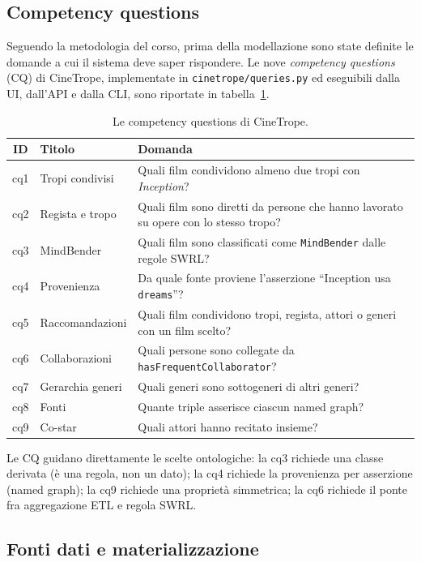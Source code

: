 \documentclass[a4paper,11pt]{article}
\newcommand{\code}[1]{\texttt{#1}}
\begin{document}
\subsection{Competency questions}

Seguendo la metodologia del corso, prima della modellazione sono state
definite le domande a cui il sistema deve saper rispondere. Le nove
\emph{competency questions} (CQ) di CineTrope, implementate in
\code{cinetrope/queries.py} ed eseguibili dalla UI, dall'API e dalla CLI,
sono riportate in tabella~\ref{tab:cq}.

\begin{table}[ht]
\centering
\caption{Le competency questions di CineTrope.}
\label{tab:cq}
\small
\begin{tabular}{@{}clp{8.6cm}@{}}
\toprule
\textbf{ID} & \textbf{Titolo} & \textbf{Domanda} \\
\midrule
cq1 & Tropi condivisi & Quali film condividono almeno due tropi con
\emph{Inception}? \\
cq2 & Regista e tropo & Quali film sono diretti da persone che hanno
lavorato su opere con lo stesso tropo? \\
cq3 & MindBender & Quali film sono classificati come \code{MindBender}
dalle regole SWRL? \\
cq4 & Provenienza & Da quale fonte proviene l'asserzione ``Inception usa
\code{dreams}''? \\
cq5 & Raccomandazioni & Quali film condividono tropi, regista, attori o
generi con un film scelto? \\
cq6 & Collaborazioni & Quali persone sono collegate da
\code{hasFrequentCollaborator}? \\
cq7 & Gerarchia generi & Quali generi sono sottogeneri di altri generi? \\
cq8 & Fonti & Quante triple asserisce ciascun named graph? \\
cq9 & Co-star & Quali attori hanno recitato insieme? \\
\bottomrule
\end{tabular}
\end{table}

Le CQ guidano direttamente le scelte ontologiche: la cq3 richiede una classe
derivata (\`e una regola, non un dato); la cq4 richiede la provenienza per
asserzione (named graph); la cq9 richiede una propriet\`a simmetrica; la cq6
richiede il ponte fra aggregazione ETL e regola SWRL.

\subsection{Fonti dati e materializzazione}
\end{document}
